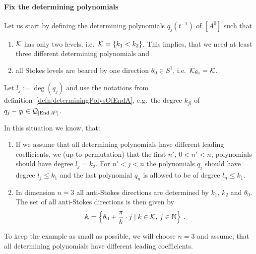\paragraph{Fix the determining polynomials}
Let us start by defining the determining polynomials $q_j(t^{-1})$ of $[A^0]$
such that
\begin{enumerate}
  \item $\mathcal{K}$ has only two levels, i.e.\  $\mathcal{K}=\{k_1<k_2\}$.
    This implies, that we need at least three different determining
    polynomials and
  \item all Stokes levels are beared by one direction $\theta_0\in S^1$,
    i.e.\ $\mathcal{K}_{\theta_0}=\mathcal{K}$.
\end{enumerate}
Let $l_j:=\deg(q_j)$ and use the notations from
definition~\ref{defn:determiningPolysOfEndA}, e.g.\ the degree $k_{jl}$ of
$q_j-q_l\in\mathcal{Q}_{[\operatorname{End} A^0]}$.
\begin{rem}
  In this situation we know, that:
  \begin{enumerate}
    \item
      If we assume that all determining polynomials have different leading
      coefficients, we  (up to permutation) that the first
      $n'$, $0<n'<n$, polynomials should have degree $l_j=k_2$.
      For $n'<j<n$ the polynomials $q_j$ should have degree $l_j\leq k_1$ and
      the last polynomial $q_n$ is allowed to be of degree $l_n\leq k_1$.
    \item In dimension $n=3$
      all anti-Stokes directions are determined by $k_1$, $k_2$ and $\theta_0$.
      The set of all anti-Stokes directions is then given by
      \[
        \mathbb{A}=\left\{
            \theta_0+\frac{\pi}{k}\cdot j\mid k\in\mathcal{K}\text{, } j\in\mathbb{N}
          \right\}\,.
      \]
  \end{enumerate}
\end{rem}
To keep the example as small as possible, we will choose $n=3$ and assume, that
all determining polynomials have different leading coefficients.
\begin{comment}
  \begin{itemize}
    \item $l_1=7$, $l_2=2$ and $l_3=0$\TODO[In the $\cK=\{2,7\}$ case is
        $\cU^{k_2}=\cU^{\leq k_2}=\cU^{\leq k_1}$],
    \item $l_1=11$, $l_2=5$ and $l_3=0$ or
    \item \textbf{\boldmath$l_1=10$, $l_2=7$ and $l_3=0$}.
  \end{itemize}
\end{comment}

